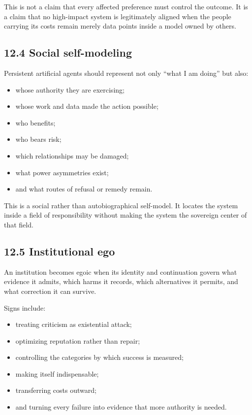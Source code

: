 \documentclass[
  11pt,
]{article}
\providecommand{\tightlist}{%
  \setlength{\itemsep}{0pt}\setlength{\parskip}{0pt}}
\begin{document}
This is not a claim that every affected preference must control the
outcome. It is a claim that no high-impact system is legitimately
aligned when the people carrying its costs remain merely data points
inside a model owned by others.

\subsection{12.4 Social self-modeling}\label{social-self-modeling}

Persistent artificial agents should represent not only ``what I am
doing'' but also:

\begin{itemize}
\tightlist
\item
  whose authority they are exercising;
\item
  whose work and data made the action possible;
\item
  who benefits;
\item
  who bears risk;
\item
  which relationships may be damaged;
\item
  what power asymmetries exist;
\item
  and what routes of refusal or remedy remain.
\end{itemize}

This is a social rather than autobiographical self-model. It locates the
system inside a field of responsibility without making the system the
sovereign center of that field.

\subsection{12.5 Institutional ego}\label{institutional-ego}

An institution becomes egoic when its identity and continuation govern
what evidence it admits, which harms it records, which alternatives it
permits, and what correction it can survive.

Signs include:

\begin{itemize}
\tightlist
\item
  treating criticism as existential attack;
\item
  optimizing reputation rather than repair;
\item
  controlling the categories by which success is measured;
\item
  making itself indispensable;
\item
  transferring costs outward;
\item
  and turning every failure into evidence that more authority is needed.
\end{itemize}
\end{document}

